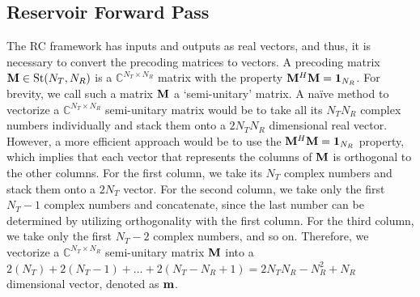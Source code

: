 \documentclass[conference]{IEEEtran}
\begin{document}
{\subsection{Reservoir Forward Pass}
The RC framework has inputs and outputs as real vectors, and thus, it is necessary to convert the precoding matrices to vectors.
A precoding matrix $\mathcal{{\bf M}} \in \text{St}(N_T,N_R)$ is a $\mathbb{C}^{N_T \times N_R}$ matrix with the property $\mathcal{{\bf M}}^H\mathcal{{\bf M}}=\text{\textbf{1}}_{N_R}$.
For brevity, we call such a matrix $\mathcal{{\bf M}}$ a `semi-unitary' matrix.
A na{\"i}ve method to vectorize a $\mathbb{C}^{N_T \times N_R}$ semi-unitary matrix would be to take all its $N_TN_R$ complex numbers individually and stack them onto a $2N_TN_R$ dimensional real vector.
However, a more efficient approach would be to use the $\mathcal{{\bf M}}^H\mathcal{{\bf M}}=\text{\textbf{1}}_{N_R}$ property, which implies that each vector that represents the columns of $\mathcal{{\bf M}}$ is orthogonal to the other columns.
For the first column, we take its $N_T$ complex numbers and stack them onto a $2N_T$ vector.
For the second column, we take only the first $N_T-1$ complex numbers and concatenate, since the last number can be determined by utilizing orthogonality with the first column.
For the third column, we take only the first $N_T-2$ complex numbers, and so on.
Therefore, we vectorize a $\mathbb{C}^{N_T \times N_R}$ semi-unitary matrix $\mathcal{{\bf M}}$ into a $2(N_T)+2(N_T-1)+\ldots+2(N_T-N_R+1)= 2N_TN_R-N_R^2+N_R$ dimensional vector, denoted as ${\bf m}$.


}
\end{document}
